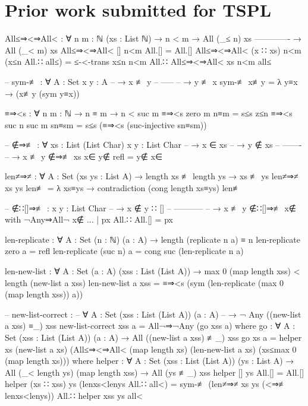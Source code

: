\documentclass[logo,bsc,singlespacing,parskip,online]{infthesis}
\renewenvironment{code}{\mintedcopy[breaklines]{agda}}{\endmintedcopy}
\begin{document}
\section{Prior work submitted for TSPL}

\begin{code}
All≤⇒<⇒All< : ∀ {n m : ℕ} (xs : List ℕ)
  → n < m
  → All (_≤ n) xs
    -------------
  → All (_< m) xs
All≤⇒<⇒All< [] n<m All.[] = All.[]
All≤⇒<⇒All< (x ∷ xs) n<m (x≤n All.∷ all≤) =
  ≤-<-trans x≤n n<m All.∷ All≤⇒<⇒All< xs n<m all≤

-- sym-≢ : ∀ {A : Set} {x y : A}
--   → x ≢ y
--     -----
--   → y ≢ x
sym-≢ x≢y = λ y≡x → (x≢y (sym y≡x))

≡⇒<s : ∀ {n m : ℕ} → n ≡ m → n < suc m
≡⇒<s {zero} {m} n≡m = s≤s z≤n
≡⇒<s {suc n} {suc m} sn≡sm = s≤s (≡⇒<s (suc-injective sn≡sm))

-- ∉⇒≢ : ∀ {xs : List (List Char)} {x y : List Char}
--   → x ∈ xs
--   → y ∉ xs
--     -------
--   → x ≢ y
∉⇒≢ {xs} x∈ y∉ refl = y∉ x∈

len≠⇒≠ : ∀ {A : Set} (xs ys : List A)
  → length xs ≢ length ys → xs ≢ ys
len≠⇒≠ xs ys len≢ =
  λ xs≡ys → contradiction (cong length xs≡ys) len≢

-- ∉∷[]⇒≢ : {x y : List Char}
--   → x ∉ y ∷ []
--     -----------
--   → x ≢ y
∉∷[]⇒≢ x∉ with ¬Any⇒All¬ x∉
... | px All.∷ All.[] = px

len-replicate : ∀ {A : Set} (n : ℕ) (a : A)
  → length (replicate n a) ≡ n
len-replicate zero a = refl
len-replicate (suc n) a = cong suc (len-replicate n a)

len-new-list : ∀ {A : Set} (a : A) (xss : List (List A))
  → max 0 (map length xss) < length (new-list a xss)
len-new-list a xss =
  ≡⇒<s (sym (len-replicate (max 0 (map length xss)) a))

-- new-list-correct :
--   ∀ {A : Set} (xss : List (List A)) (a : A)
--   → ¬ Any ((new-list a xss) ≡_) xss
new-list-correct xss a = All¬⇒¬Any (go xss a)
  where
    go : ∀ {A : Set} (xss : List (List A)) (a : A)
      → All ((new-list a xss) ≢_) xss
    go xs a =
      helper
        xs
        (new-list a xs)
        (All≤⇒<⇒All<
          (map length xs)
          (len-new-list a xs)
          (xs≤max 0 (map length xs)))
      where
        helper : ∀ {A : Set} (xss : List (List A)) (ys : List A)
          → All (_< length ys) (map length xss)
          → All (ys ≢_) xss
        helper [] ys All.[] = All.[]
        helper (xs ∷ xss) ys (lenxs<lenys All.∷ all<) =
          sym-≢ (len≠⇒≠ xs ys (<⇒≢ lenxs<lenys))
            All.∷ helper xss ys all<
\end{code}
\end{document}
